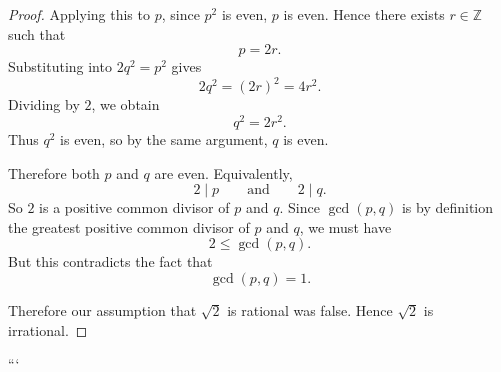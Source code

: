 \begin{proof}
Applying this to $p$, since $p^2$ is even, $p$ is even. Hence there exists $r\in\mathbb Z$ such that
\[
p=2r.
\]
Substituting into $2q^2=p^2$ gives
\[
2q^2=(2r)^2=4r^2.
\]
Dividing by $2$, we obtain
\[
q^2=2r^2.
\]
Thus $q^2$ is even, so by the same argument, $q$ is even.

Therefore both $p$ and $q$ are even. Equivalently,
\[
2 \mid p
\qquad\text{and}\qquad
2 \mid q.
\]
So $2$ is a positive common divisor of $p$ and $q$. Since $\gcd(p,q)$ is by definition the greatest positive common divisor of $p$ and $q$, we must have
\[
2 \leq \gcd(p,q).
\]
But this contradicts the fact that
\[
\gcd(p,q)=1.
\]

Therefore our assumption that $\sqrt{2}$ is rational was false. Hence $\sqrt{2}$ is irrational.
\end{proof}
```